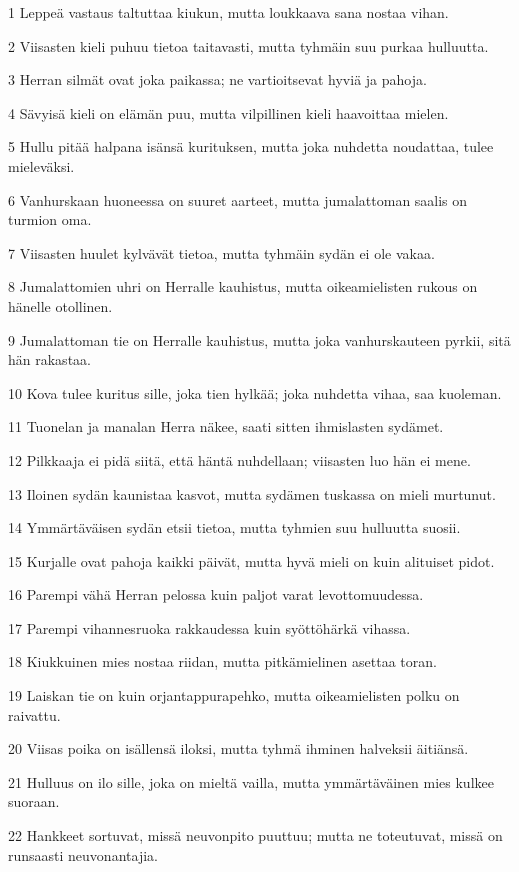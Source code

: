 \par 1 Leppeä vastaus taltuttaa kiukun, mutta loukkaava sana nostaa vihan.
\par 2 Viisasten kieli puhuu tietoa taitavasti, mutta tyhmäin suu purkaa hulluutta.
\par 3 Herran silmät ovat joka paikassa; ne vartioitsevat hyviä ja pahoja.
\par 4 Sävyisä kieli on elämän puu, mutta vilpillinen kieli haavoittaa mielen.
\par 5 Hullu pitää halpana isänsä kurituksen, mutta joka nuhdetta noudattaa, tulee mieleväksi.
\par 6 Vanhurskaan huoneessa on suuret aarteet, mutta jumalattoman saalis on turmion oma.
\par 7 Viisasten huulet kylvävät tietoa, mutta tyhmäin sydän ei ole vakaa.
\par 8 Jumalattomien uhri on Herralle kauhistus, mutta oikeamielisten rukous on hänelle otollinen.
\par 9 Jumalattoman tie on Herralle kauhistus, mutta joka vanhurskauteen pyrkii, sitä hän rakastaa.
\par 10 Kova tulee kuritus sille, joka tien hylkää; joka nuhdetta vihaa, saa kuoleman.
\par 11 Tuonelan ja manalan Herra näkee, saati sitten ihmislasten sydämet.
\par 12 Pilkkaaja ei pidä siitä, että häntä nuhdellaan; viisasten luo hän ei mene.
\par 13 Iloinen sydän kaunistaa kasvot, mutta sydämen tuskassa on mieli murtunut.
\par 14 Ymmärtäväisen sydän etsii tietoa, mutta tyhmien suu hulluutta suosii.
\par 15 Kurjalle ovat pahoja kaikki päivät, mutta hyvä mieli on kuin alituiset pidot.
\par 16 Parempi vähä Herran pelossa kuin paljot varat levottomuudessa.
\par 17 Parempi vihannesruoka rakkaudessa kuin syöttöhärkä vihassa.
\par 18 Kiukkuinen mies nostaa riidan, mutta pitkämielinen asettaa toran.
\par 19 Laiskan tie on kuin orjantappurapehko, mutta oikeamielisten polku on raivattu.
\par 20 Viisas poika on isällensä iloksi, mutta tyhmä ihminen halveksii äitiänsä.
\par 21 Hulluus on ilo sille, joka on mieltä vailla, mutta ymmärtäväinen mies kulkee suoraan.
\par 22 Hankkeet sortuvat, missä neuvonpito puuttuu; mutta ne toteutuvat, missä on runsaasti neuvonantajia.
